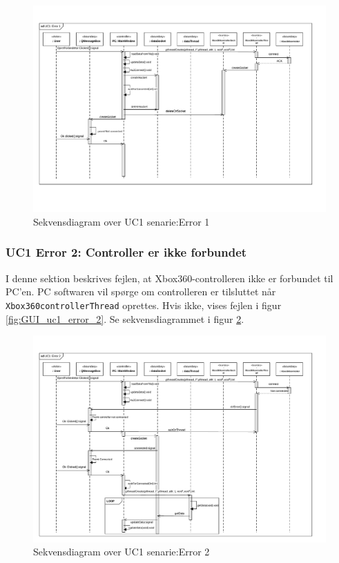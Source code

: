 \begin{landscape}
\begin{figure}[H]
\centering
\includegraphics[width=\linewidth]{../fig/diagrammer/pc/sd_uc1_Error_1.pdf}
\caption{Sekvensdiagram over UC1 senarie:Error 1}
\label{fig:cd_uc1_error_1}
\end{figure}
\end{landscape}

\clearpage
\subsubsection{UC1 Error 2: Controller er ikke forbundet}
I denne sektion beskrives fejlen, at Xbox360-controlleren ikke er forbundet til PC'en. \linebreak[3] 
PC softwaren vil spørge om controlleren er tilsluttet når \texttt{Xbox360controllerThread} oprettes. 
Hvis ikke, vises fejlen i figur \ref{fig:GUI_uc1_error_2}. 
Se sekvensdiagrammet i figur \ref{fig:cd_uc1_error_2}.

\begin{figure}[h!]
\centering
\includegraphics[width=\textwidth* 1]{../fig/diagrammer/pc/sd_uc1_Error_2.pdf}
\caption{Sekvensdiagram over UC1 senarie:Error 2}
\label{fig:cd_uc1_error_2}
\end{figure}

